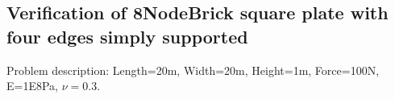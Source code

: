\documentclass[fleqn,11pt,letter]{article}
\begin{document}

















\newpage
\subsection{Verification of 8NodeBrick square plate with four edges simply supported}

Problem description: Length=20m, Width=20m, Height=1m, Force=100N, E=1E8Pa, $\nu=0.3$. 
\end{document}
